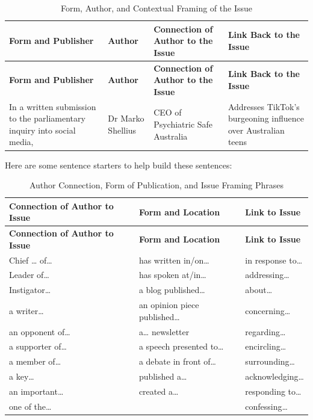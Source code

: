 \documentclass[a4paper]{article}
\begin{document}
\begin{longtable}{|p{2.75cm}|p{2cm}|p{2.75cm}|p{2.75cm}|}
\caption{Form, Author, and Contextual Framing of the Issue} \label{tab:formauthorcontext} \\
\hline
\textbf{Form and Publisher} & \textbf{Author} & \textbf{Connection of Author to the Issue} & \textbf{Link Back to the Issue} \\
\hline
\endfirsthead

\hline
\textbf{Form and Publisher} & \textbf{Author} & \textbf{Connection of Author to the Issue} & \textbf{Link Back to the Issue} \\
\hline
\endhead

\hline
\endfoot

In a written submission to the parliamentary inquiry into social media, & Dr Marko Shellius & CEO of Psychiatric Safe Australia & Addresses TikTok’s burgeoning influence over Australian teens \\
\hline

\end{longtable}

Here are some sentence starters to help build these sentences:
\begin{longtable}{|p{2.5cm}|p{3cm}|p{2.5cm}|}
\caption{Author Connection, Form of Publication, and Issue Framing Phrases} \label{tab:authorformissue} \\
\hline
\textbf{Connection of Author to Issue} & \textbf{Form and Location} & \textbf{Link to Issue} \\
\hline
\endfirsthead

\hline
\textbf{Connection of Author to Issue} & \textbf{Form and Location} & \textbf{Link to Issue} \\
\hline
\endhead

\hline
\endfoot

Chief … of…                & has written in/on…            & in response to… \\
Leader of…                 & has spoken at/in…             & addressing… \\
Instigator…                & a blog published…             & about… \\
a writer…                  & an opinion piece published…   & concerning… \\
an opponent of…            & a… newsletter                 & regarding… \\
a supporter of…            & a speech presented to…        & encircling… \\
a member of…               & a debate in front of…         & surrounding… \\
a key…                     & published a…                  & acknowledging… \\
an important…              & created a…                    & responding to… \\
one of the…                &                               & confessing… \\
\hline

\end{longtable}
\end{document}
